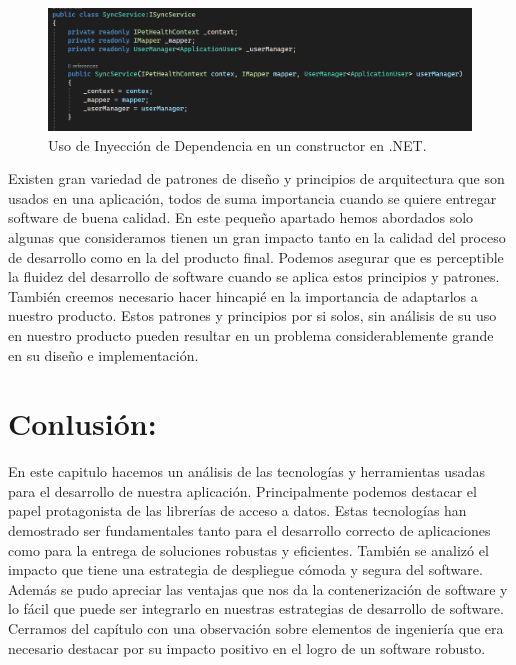 \begin{figure}[H]
	\centering
	\includegraphics[width = 12cm]{Graphics/dep_inj_example.jpg}
	\caption{Uso de Inyección de Dependencia en un constructor en .NET.}
	\label{fig:di_use_example}
\end{figure}

Existen gran variedad de patrones de diseño y principios de arquitectura que son usados en una aplicación, todos de suma importancia cuando se quiere entregar software de buena calidad. En este pequeño apartado hemos abordados solo algunas que consideramos tienen un gran impacto tanto en la calidad del proceso de desarrollo como en la del producto final. Podemos asegurar que es perceptible la fluidez del desarrollo de software cuando se aplica estos principios y patrones. También creemos necesario hacer hincapié en la importancia de adaptarlos a nuestro producto. Estos patrones y principios por si solos, sin análisis de su uso en nuestro producto pueden resultar en un problema considerablemente grande en su diseño e implementación.

\section{Conlusión:}
En este capitulo hacemos un análisis de las tecnologías y herramientas usadas para el desarrollo de nuestra aplicación. Principalmente podemos destacar el papel protagonista de las librerías de acceso a datos. Estas tecnologías han demostrado ser fundamentales tanto para el desarrollo correcto de aplicaciones como para la entrega de soluciones robustas y eficientes. También se analizó el impacto que tiene una estrategia de despliegue cómoda y segura del software. Además se pudo apreciar las ventajas que nos da la contenerización de software y lo fácil que puede ser integrarlo en nuestras estrategias de desarrollo de software.  Cerramos del capítulo con una observación sobre elementos de ingeniería que era necesario destacar por su impacto positivo en el logro de un software robusto.
